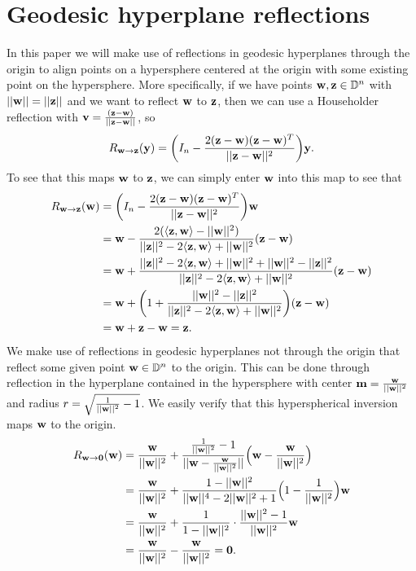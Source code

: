 \newpage
\section{Geodesic hyperplane reflections}\label{sec:reflections}
In this paper we will make use of reflections in geodesic hyperplanes through the origin to align points on a hypersphere centered at the origin with some existing point on the hypersphere. More specifically, if we have points $\mathbf{w}, \mathbf{z} \in \mathbb{D}^n$ with $||\mathbf{w}|| = ||\mathbf{z}||$ and we want to reflect $\mathbf{w}$ to $\mathbf{z}$, then we can use a Householder reflection with $\mathbf{v} = \frac{(\mathbf{z} - \mathbf{w})}{||\mathbf{z} - \mathbf{w}||}$, so
\begin{equation}
    R_{\mathbf{w} \rightarrow \mathbf{z}} (\mathbf{y}) = \bigg(I_n - \frac{2 (\mathbf{z} - \mathbf{w}) (\mathbf{z} - \mathbf{w})^T}{||\mathbf{z} - \mathbf{w}||^2}\bigg) \mathbf{y}.
\end{equation}
To see that this maps $\mathbf{w}$ to $\mathbf{z}$, we can simply enter $\mathbf{w}$ into this map to see that
\begin{align}
    R_{\mathbf{w} \rightarrow \mathbf{z}} (\mathbf{w}) &= \bigg(I_n - \frac{2 (\mathbf{z} - \mathbf{w}) (\mathbf{z} - \mathbf{w})^T}{||\mathbf{z} - \mathbf{w}||^2}\bigg) \mathbf{w} \\
    &= \mathbf{w} - \frac{2(\langle \mathbf{z}, \mathbf{w} \rangle - ||\mathbf{w}||^2)}{||\mathbf{z}||^2 - 2 \langle \mathbf{z}, \mathbf{w} \rangle + ||\mathbf{w}||^2} (\mathbf{z} - \mathbf{w}) \\
    &= \mathbf{w} + \frac{||\mathbf{z}||^2 - 2 \langle \mathbf{z}, \mathbf{w} \rangle + ||\mathbf{w}||^2 + ||\mathbf{w}||^2 - ||\mathbf{z}||^2}{||\mathbf{z}||^2 - 2 \langle \mathbf{z}, \mathbf{w} \rangle + ||\mathbf{w}||^2} (\mathbf{z} - \mathbf{w}) \\
    &= \mathbf{w} + \bigg(1 + \frac{||\mathbf{w}||^2 - ||\mathbf{z}||^2}{||\mathbf{z}||^2 - 2 \langle \mathbf{z}, \mathbf{w} \rangle + ||\mathbf{w}||^2}\bigg) (\mathbf{z} - \mathbf{w}) \\
    &= \mathbf{w} + \mathbf{z} - \mathbf{w} = \mathbf{z}.
\end{align}
We make use of reflections in geodesic hyperplanes not through the origin that reflect some given point $\mathbf{w} \in \mathbb{D}^n$ to the origin. This can be done through reflection in the hyperplane contained in the hypersphere with center $\mathbf{m} = \frac{\mathbf{w}}{||\mathbf{w}||^2}$ and radius $r = \sqrt{\frac{1}{||\mathbf{w}||^2} - 1}$. We easily verify that this hyperspherical inversion maps $\mathbf{w}$ to the origin.
\begin{align}
    R_{\mathbf{w} \rightarrow \mathbf{0}} (\mathbf{w}) &= \frac{\mathbf{w}}{||\mathbf{w}||^2} + \frac{\frac{1}{||\mathbf{w}||^2} - 1}{||\mathbf{w} - \frac{\mathbf{w}}{||\mathbf{w}||^2}||} \Big(\mathbf{w} - \frac{\mathbf{w}}{||\mathbf{w}||^2}\Big) \\
    &= \frac{\mathbf{w}}{||\mathbf{w}||^2} + \frac{1 - ||\mathbf{w}||^2}{||\mathbf{w}||^4 - 2 ||\mathbf{w}||^2 + 1} \Big( 1 - \frac{1}{||\mathbf{w}||^2} \Big) \mathbf{w} \\
    &= \frac{\mathbf{w}}{||\mathbf{w}||^2} + \frac{1}{1 - ||\mathbf{w}||^2} \cdot \frac{||\mathbf{w}||^2 - 1}{||\mathbf{w}||^2} \mathbf{w} \\
    &= \frac{\mathbf{w}}{||\mathbf{w}||^2} - \frac{\mathbf{w}}{||\mathbf{w}||^2} = \mathbf{0}.
\end{align}
